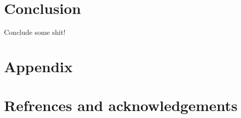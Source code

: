 \documentclass[norsk,a4paper,11pt]{article}
\begin{document}
\begin{multicols}{2}

\section{Conclusion} %
\label{sec:conclusion}

Conclude some shit!



\section{Appendix} %
\label{sec:appendix}


\section{Refrences and acknowledgements} %
\label{sec:refrences_and_acknowledgements}






\end{multicols}
\end{document}
